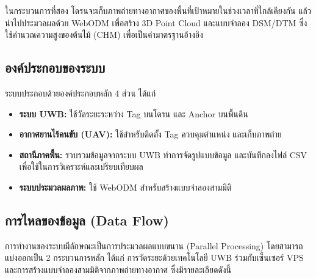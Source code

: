 ในกระบวนการที่สอง โดรนจะเก็บภาพถ่ายทางอากาศของพื้นที่เป้าหมายในช่วงเวลาที่ใกล้เคียงกัน แล้วนำไปประมวลผลด้วย WebODM เพื่อสร้าง 3D Point Cloud และแบบจำลอง DSM/DTM ซึ่งใช้คำนวณความสูงของต้นไม้ (CHM) เพื่อเป็นค่ามาตรฐานอ้างอิง

\subsection{องค์ประกอบของระบบ}
ระบบประกอบด้วยองค์ประกอบหลัก 4 ส่วน ได้แก่
\begin{itemize}
    \item \textbf{ระบบ UWB:} ใช้วัดระยะระหว่าง Tag บนโดรน และ Anchor บนพื้นดิน
    \item \textbf{อากาศยานไร้คนขับ (UAV):} ใช้สำหรับติดตั้ง Tag ควบคุมตำแหน่ง และเก็บภาพถ่าย
    \item \textbf{สถานีภาคพื้น:} รวบรวมข้อมูลจากระบบ UWB ทำการจัดรูปแบบข้อมูล และบันทึกลงไฟล์ CSV เพื่อใช้ในการวิเคราะห์และเปรียบเทียบผล
    \item \textbf{ระบบประมวลผลภาพ:} ใช้ WebODM สำหรับสร้างแบบจำลองสามมิติ
\end{itemize}

\subsection{การไหลของข้อมูล (Data Flow)}
การทำงานของระบบมีลักษณะเป็นการประมวลผลแบบขนาน (Parallel Processing) โดยสามารถแบ่งออกเป็น 2 กระบวนการหลัก ได้แก่ การวัดระยะด้วยเทคโนโลยี UWB ร่วมกับเซ็นเซอร์ VPS และการสร้างแบบจำลองสามมิติจากภาพถ่ายทางอากาศ ซึ่งมีรายละเอียดดังนี้

